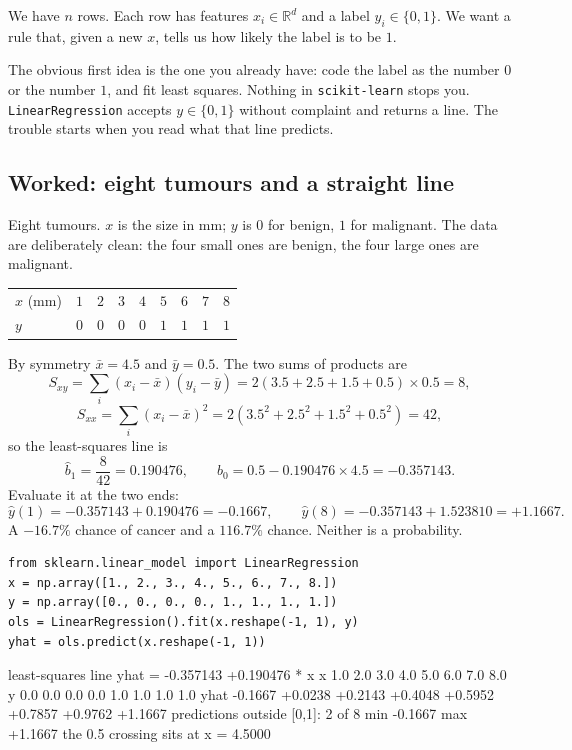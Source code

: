 \documentclass[11pt]{article}
\begin{document}
We have $n$ rows. Each row has features $x_i \in \mathbb{R}^d$ and a label
$y_i \in \{0, 1\}$. We want a rule that, given a new $x$, tells us how likely
the label is to be $1$.

The obvious first idea is the one you already have: code the label as the
number $0$ or the number $1$, and fit least squares. Nothing in
\texttt{scikit-learn} stops you. \texttt{LinearRegression} accepts
$y \in \{0,1\}$ without complaint and returns a line. The trouble starts when
you read what that line predicts.

\subsection{Worked: eight tumours and a straight line}
\label{sec:eight}

\begin{worked}[A probability of $-16.7\%$]
Eight tumours. $x$ is the size in mm; $y$ is $0$ for benign, $1$ for
malignant. The data are deliberately clean: the four small ones are benign,
the four large ones are malignant.
\begin{center}
\begin{tabular}{@{}lrrrrrrrr@{}}
\toprule
$x$ (mm) & $1$ & $2$ & $3$ & $4$ & $5$ & $6$ & $7$ & $8$\\
$y$      & $0$ & $0$ & $0$ & $0$ & $1$ & $1$ & $1$ & $1$\\
\bottomrule
\end{tabular}
\end{center}
By symmetry $\bar x = 4.5$ and $\bar y = 0.5$. The two sums of products are
\[
  S_{xy} = \sum_i (x_i - \bar x)(y_i - \bar y)
         = 2\left(3.5 + 2.5 + 1.5 + 0.5\right)\times 0.5 = 8,
\]
\[
  S_{xx} = \sum_i (x_i - \bar x)^2
         = 2\left(3.5^2 + 2.5^2 + 1.5^2 + 0.5^2\right) = 42 ,
\]
so the least-squares line is
\[
  \hat b_1 = \frac{8}{42} = 0.190476, \qquad
  \hat b_0 = 0.5 - 0.190476 \times 4.5 = -0.357143 .
\]
Evaluate it at the two ends:
\[
  \hat y(1) = -0.357143 + 0.190476 = \mathbf{-0.1667},
  \qquad
  \hat y(8) = -0.357143 + 1.523810 = \mathbf{+1.1667}.
\]
A $-16.7\%$ chance of cancer and a $116.7\%$ chance. Neither is a
probability.
\end{worked}

\begin{lstlisting}
from sklearn.linear_model import LinearRegression
x = np.array([1., 2., 3., 4., 5., 6., 7., 8.])
y = np.array([0., 0., 0., 0., 1., 1., 1., 1.])
ols = LinearRegression().fit(x.reshape(-1, 1), y)
yhat = ols.predict(x.reshape(-1, 1))
\end{lstlisting}
\begin{codeout}
least-squares line  yhat = -0.357143 +0.190476 * x
x        1.0     2.0     3.0     4.0     5.0     6.0     7.0     8.0
y        0.0     0.0     0.0     0.0     1.0     1.0     1.0     1.0
yhat  -0.1667  +0.0238  +0.2143  +0.4048  +0.5952  +0.7857  +0.9762  +1.1667
predictions outside [0,1]: 2 of 8   min -0.1667   max +1.1667
the 0.5 crossing sits at x = 4.5000
\end{codeout}
\end{document}
